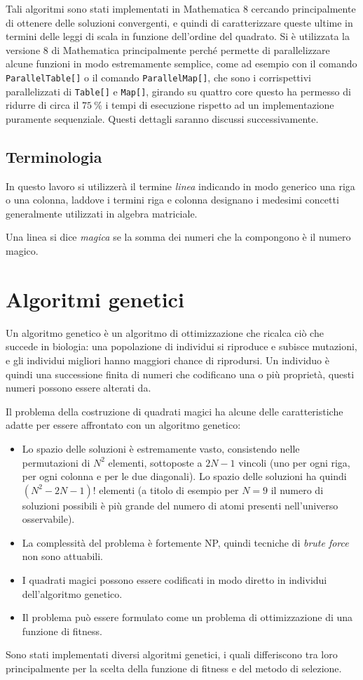 \documentclass[italian,twoside,twocolumn]{article}
\begin{document}
Tali algoritmi sono stati implementati in Mathematica 8 cercando principalmente di ottenere delle soluzioni convergenti, e quindi di caratterizzare queste ultime in termini delle leggi di scala in funzione dell'ordine del quadrato. Si è utilizzata la versione 8 di Mathematica principalmente perché permette di parallelizzare alcune funzioni in modo estremamente semplice, come ad esempio con il comando \texttt{ParallelTable[]} o il comando \texttt{ParallelMap[]}, che sono i corrispettivi parallelizzati di \texttt{Table[]} e \texttt{Map[]}, girando su quattro core questo ha permesso di ridurre di circa il $ \SI{75}{\percent} $ i tempi di esecuzione rispetto ad un implementazione puramente sequenziale. Questi dettagli saranno discussi successivamente.

\subsection{Terminologia}

In questo lavoro si utilizzerà il termine \emph{linea} indicando in modo generico una riga o una colonna, laddove i termini riga e colonna designano i medesimi concetti generalmente utilizzati in algebra matriciale. 

Una linea si dice \emph{magica} se la somma dei numeri che la compongono è il numero magico.

\section{Algoritmi genetici}
Un algoritmo genetico è un algoritmo di ottimizzazione che ricalca ciò che succede in biologia: una popolazione di individui si riproduce e subisce mutazioni, e gli individui migliori hanno maggiori chance di riprodursi. Un individuo è quindi una successione finita di numeri che codificano una o più proprietà, questi numeri possono essere alterati da.



Il problema della costruzione di quadrati magici ha alcune delle caratteristiche adatte per essere affrontato con un algoritmo genetico:
\begin{itemize}
	\item Lo spazio delle soluzioni è estremamente vasto, consistendo nelle permutazioni di $ N^2 $ elementi, sottoposte a $ 2 N - 1 $ vincoli (uno per ogni riga, per ogni colonna e per le due diagonali). Lo spazio delle soluzioni ha quindi $ (N^2 - 2N - 1)! $ elementi (a titolo di esempio per $ N = 9 $ il numero di soluzioni possibili è più grande del numero di atomi presenti nell'universo osservabile). 
	\item La complessità del problema è fortemente NP, quindi tecniche di \emph{brute force} non sono attuabili.
	\item I quadrati magici possono essere codificati in modo diretto in individui dell'algoritmo genetico.
	\item Il problema può essere formulato come un problema di ottimizzazione di una funzione di fitness.
\end{itemize}
Sono stati implementati diversi algoritmi genetici, i quali differiscono tra loro principalmente per la scelta della funzione di fitness e del metodo di selezione. 
\end{document}
